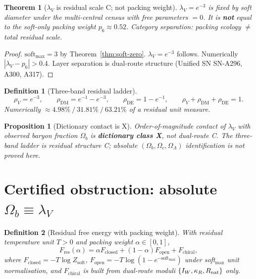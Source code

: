 \documentclass[11pt,a4paper]{article}
\newtheorem{theorem}{Theorem}
\newtheorem{proposition}{Proposition}
\newtheorem{definition}{Definition}
\theoremstyle{remark}
\begin{document}
\begin{theorem}[$\lambda_V$ is residual scale C; not packing weight]
\label{thm:lambdaV}
$\lambda_V=e^{-3}$ is fixed by soft diameter under the multi-central census with free parameters $=0$. It is \textbf{not} equal to the soft-only packing weight $p_6\approx 0.52$. Category separation: packing ecology $\neq$ total residual scale.
\end{theorem}

\begin{proof}
$\mathrm{soft}_{\max}=3$ by Theorem~\ref{thm:soft-zero}. $\lambda_V=e^{-3}$ follows. Numerically $|\lambda_V-p_6|>0.4$. Layer separation is dual-route structure (Unified SN SN-A296, A300, A317).
\end{proof}

\begin{definition}[Three-band residual ladder]
\label{def:bands}
\begin{equation}
\rho_V=e^{-3},\qquad
\rho_{\mathrm{DM}}=e^{-1}-e^{-3},\qquad
\rho_{\mathrm{DE}}=1-e^{-1},
\qquad
\rho_V+\rho_{\mathrm{DM}}+\rho_{\mathrm{DE}}=1.
\end{equation}
Numerically $\approx 4.98\%\ /\ 31.81\%\ /\ 63.21\%$ of a residual unit measure.
\end{definition}

\begin{proposition}[Dictionary contact is X]
\label{prop:dict}
Order-of-magnitude contact of $\lambda_V$ with observed baryon fraction $\Omega_b$ is \textbf{dictionary class X}, not dual-route C. The three-band ladder is residual structure C; absolute $(\Omega_b,\Omega_c,\Omega_\Lambda)$ identification is not proved here.
\end{proposition}

\section{Certified obstruction: absolute $\Omega_b\equiv\lambda_V$}
\label{sec:obstruction}

\begin{definition}[Residual free energy with packing weight]
\label{def:Fres}
With residual temperature unit $T>0$ and packing weight $\alpha\in[0,1]$,
\begin{equation}
F_{\mathrm{res}}(\alpha)
=
\alpha F_{\mathrm{closed}}+(1-\alpha)F_{\mathrm{open}}+F_{\mathrm{chiral}},
\end{equation}
where $F_{\mathrm{closed}}=-T\log Z_{\mathrm{soft}}$, $F_{\mathrm{open}}=-T\log(1-e^{-\mathrm{soft}_{\max}})$ under soft$_{\max}$ unit normalisation, and $F_{\mathrm{chiral}}$ is built from dual-route moduli $\{I_W,\kappa_R,R_{\rm nat}\}$ only.
\end{definition}
\end{document}
